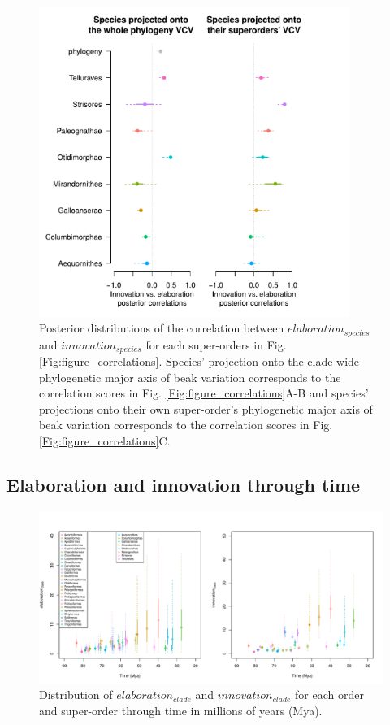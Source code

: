 \documentclass[12pt,a4paper]{article}
\begin{document}
\begin{figure}[H]
\centering
   \includegraphics[width=0.9\textwidth]{Figures/correlations_fable.pdf}
\caption{Posterior distributions of the correlation between $elaboration_{species}$ and $innovation_{species}$ for each super-orders in Fig. \ref{Fig:figure_correlations}. Species' projection onto the clade-wide phylogenetic major axis of beak variation corresponds to the correlation scores in Fig. \ref{Fig:figure_correlations}A-B and species' projections onto their own super-order's phylogenetic major axis of beak variation corresponds to the correlation scores in Fig. \ref{Fig:figure_correlations}C.}
\label{Fig:fable_correlations}
\end{figure}

\newpage






\subsection{Elaboration and innovation through time}


\begin{figure}[H]
\centering
   \includegraphics[width=1\textwidth]{Figures/Elaboration_and_innovation_clade_through_time.pdf}
\caption{Distribution of $elaboration_{clade}$ and $innovation_{clade}$ for each order and super-order through time in millions of years (Mya).}
\label{Fig:figure_ei_clade_through_time}
\end{figure}
\end{document}
